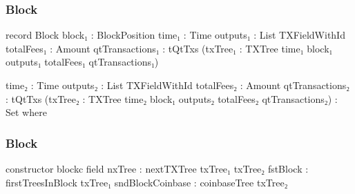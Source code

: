 \documentclass{beamer}
\begin{document}
\begin{frame}
  \frametitle{Block}
\begin{code}

      record Block
        {block₁ : BlockPosition}
        {time₁ : Time}
        {outputs₁ : List TXFieldWithId}
        {totalFees₁ : Amount}
        {qtTransactions₁ : tQtTxs}
        (txTree₁ : TXTree time₁ block₁ outputs₁
          totalFees₁ qtTransactions₁)

        {time₂ : Time}
        {outputs₂ : List TXFieldWithId}
        {totalFees₂ : Amount}
        {qtTransactions₂ : tQtTxs}
        (txTree₂ : TXTree time₂ block₁ outputs₂
          totalFees₂ qtTransactions₂)
        : Set where

\end{code}
\end{frame}
\begin{frame}
  \frametitle{Block}
\begin{code}

        constructor blockc
        field
          nxTree           : nextTXTree txTree₁ txTree₂
          fstBlock         : firstTreesInBlock txTree₁
          sndBlockCoinbase : coinbaseTree txTree₂

\end{code}
\end{frame}
\end{document}
